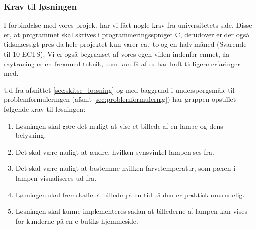 \subsubsection{Krav til løsningen}
\label{sec:krav}

I forbindelse med vores projekt har vi fået nogle krav fra universitetets side. Disse er, at programmet skal skrives i programmeringssproget C, derudover er der også tidsmæssigt pres da hele projektet kun varer ca.\ to og en halv måned (Svarende til 10 ECTS). 
Vi er også begrænset af vores egen viden indenfor emnet, da raytracing er en fremmed teknik, som kun få af os har haft tidligere erfaringer med. 

Ud fra afsnittet \ref{sec:skitse_loesning} og med baggrund i underspørgsmåle til problemformuleringen (afsnit \ref{sec:problemformulering}) har gruppen opstillet følgende krav til løsningen:
\begin{enumerate}
    \item Løsningen skal gøre det muligt at vise et billede af en lampe og dens belysning.
    \item Det skal være muligt at ændre, hvilken synsvinkel lampen ses fra.
    \item Det skal være muligt at bestemme hvilken farvetemperatur, som pæren i lampen visualiseres ud fra.
    \item Løsningen skal fremskaffe et billede på en tid så den er praktisk anvendelig.
    \item Løsningen skal kunne implementeres sådan at billederne af lampen kan vises for kunderne på en e-butiks hjemmeside.
\end{enumerate}